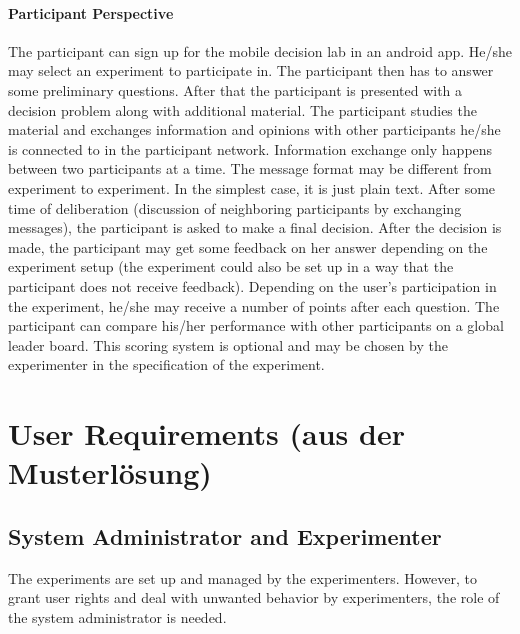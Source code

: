 \documentclass[a4paper, 10pt]{scrreprt}
\begin{document}
\subsection{Participant Perspective}
The participant can sign up for the mobile decision lab in an android app. He/she may select an experiment to participate in. The participant then has to answer some preliminary questions. After that the participant is presented with a decision problem along with additional material. The participant studies the material and exchanges information and opinions with other participants he/she is connected to in the participant network. Information exchange only happens between two participants at a time. The message format may be different from experiment to experiment. In the simplest case, it is just plain text. After some time of deliberation (discussion of neighboring participants by exchanging messages), the participant is asked to make a final decision. After the decision is made, the participant may get some feedback on her answer depending on the experiment setup (the experiment could also be set up in a way that the participant does not receive feedback). Depending on the user's participation in the experiment, he/she may receive a number of points after each question. The participant can compare his/her performance with other participants on a global leader board. This scoring system is optional and may be chosen by the experimenter in the specification of the experiment.




\printnoidxglossary[sort=word]



\part{User Requirements (aus der Musterlösung)}

\chapter{System Administrator and Experimenter}
The experiments are set up and managed by the experimenters. 
However, to grant user rights and deal with unwanted behavior by experimenters, the role of the system administrator is needed.
\end{document}
